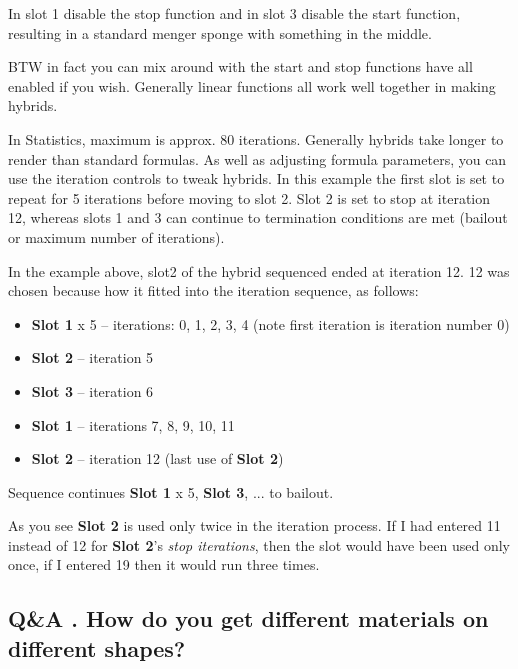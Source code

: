 In slot 1 disable the stop function
and in slot 3 disable the start function, resulting in a standard menger sponge
with something in the middle.

BTW in fact you can mix around
with the start and stop functions have all enabled if you wish. Generally linear
functions all work well together in making hybrids.

In
Statistics, maximum is approx. 80 iterations. Generally hybrids take longer to
render than standard formulas.
As well as adjusting formula parameters, you
can use the iteration controls to tweak hybrids. In this example the first slot
is set to repeat for 5 iterations before moving to slot 2. Slot 2 is set to stop
at iteration 12, whereas slots 1 and 3 can continue to termination conditions are
met (bailout or maximum number of iterations).

In the example above, slot2 of the hybrid sequenced ended at iteration 12. 12
was chosen because how it fitted into the iteration sequence, as follows:

\begin{itemize}
\item \textbf{Slot 1} x 5 -- iterations: 0, 1, 2, 3, 4 (note first iteration is iteration number 0)
\item \textbf{Slot 2} -- iteration 5
\item \textbf{Slot 3} -- iteration 6
\item \textbf{Slot 1} -- iterations 7, 8, 9, 10, 11
\item \textbf{Slot 2} -- iteration 12 (last use of \textbf{Slot 2})
\end{itemize}

Sequence continues \textbf{Slot 1} x 5, \textbf{Slot 3}, ... to bailout.

As you see \textbf{Slot 2} is used only twice in the iteration process. If I had entered 11 instead of 12 for \textbf{Slot 2}'s \emph{stop iterations}, then the slot would have been used only once, if I entered 19 then it would run three times.

\subsection{Q\&A . How do you get different materials on different
	shapes?}\label{qa-.-how-do-you-get-different-materials-on-different-shapes}

